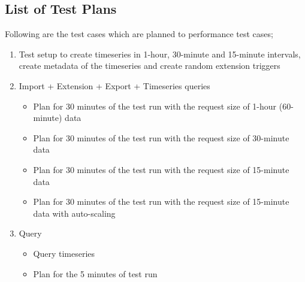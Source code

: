 \subsection{List of Test Plans}
\label{subse:test_plan_flow}
Following are the test cases which are planned to performance test cases;
\begin{enumerate}
    \item Test setup to create timeseries in 1-hour, 30-minute and 15-minute intervals, create metadata of the timeseries and create random extension triggers
    \item Import + Extension + Export + Timeseries queries
    \begin{itemize}
        \item Plan for 30 minutes of the test run with the request size of 1-hour (60-minute) data
        \item Plan for 30 minutes of the test run with the request size of 30-minute data
        \item Plan for 30 minutes of the test run with the request size of 15-minute data
        \item Plan for 30 minutes of the test run with the request size of 15-minute data with auto-scaling
    \end{itemize}
    \item Query
    \begin{itemize}
        \item Query timeseries
        \item Plan for the 5 minutes of test run
    \end{itemize}
\end{enumerate}


